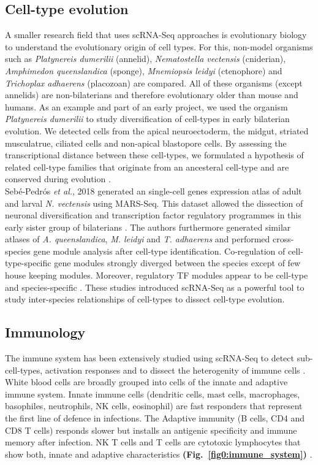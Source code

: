 \subsection{Cell-type evolution} 

A smaller research field that uses scRNA-Seq approaches is evolutionary biology to understand the evolutionary origin of cell types. For this, non-model organisms such as \textit{Platynereis dumerilii} (annelid), \textit{Nematostella vectensis} (cniderian), \textit{Amphimedon queenslandica} (sponge), \textit{Mnemiopsis leidyi} (ctenophore) and \textit{Trichoplax adhaerens} (placozoan) are compared. All of these organisms (except annelids) are non-bilaterians and therefore evolutionary older than mouse and humans. As an example and part of an early project, we used the organism \textit{Platynereis dumerilii} to study diversification of cell-types in early bilaterian evolution. We detected cells from the apical neuroectoderm, the midgut, striated musculatrue, ciliated cells and non-apical blastopore cells. By assessing the transcriptional distance between these cell-types, we formulated a hypothesis of related cell-type families that originate from an ancesteral cell-type and are conserved during evolution \citep{Achim2018}.  \\

Seb\'e{}-Pedr\'o{}s \emph{et al.}, 2018 generated an single-cell genes expression atlas of adult and larval \textit{N. vectensis} using MARS-Seq. This dataset allowed the dissection of neuronal diversification and transcription factor regulatory programmes in this early sister group of bilaterians \citep{Sebe-Pedros2018}. The authors furthermore generated similar atlases of \textit{A. queenslandica}, \textit{M. leidyi} and \textit{T. adhaerens} and performed cross-species gene module analysis after cell-type identification. Co-regulation of cell-type-specific gene modules strongly diverged between the species except of few house keeping modules. Moreover, regulatory TF modules appear to be cell-type and species-specific \citep{Sebe-Pedros2018a}. These studies introduced scRNA-Seq as a powerful tool to study inter-species relationships of cell-types to dissect cell-type evolution. 

\subsection{Immunology}

The immune system has been extensively studied using scRNA-Seq to detect sub-cell-types, activation responses and to dissect the heterogenity of immune cells \citep{Proserpio2015, Satija2014}. White blood cells are broadly grouped into cells of the innate and adaptive immune system. Innate immune cells (dendritic cells, mast cells, macrophages, basophiles, neutrophils, \gls{NK} cells, eosinophil) are fast responders that represent the first line of defence in infections. The Adaptive immunity (B cells, CD4\plus{} and CD8\plus{} T cells) responds slower but installs an antigenic specificity and immune memory after infection. \gls{NK} T cells and \textgamma{}\textdelta{} T cells are cytotoxic lymphocytes that show both, innate and adaptive characteristics \textbf{(Fig.~\ref{fig0:immune_system})} \citep{Dranoff2004}. 

